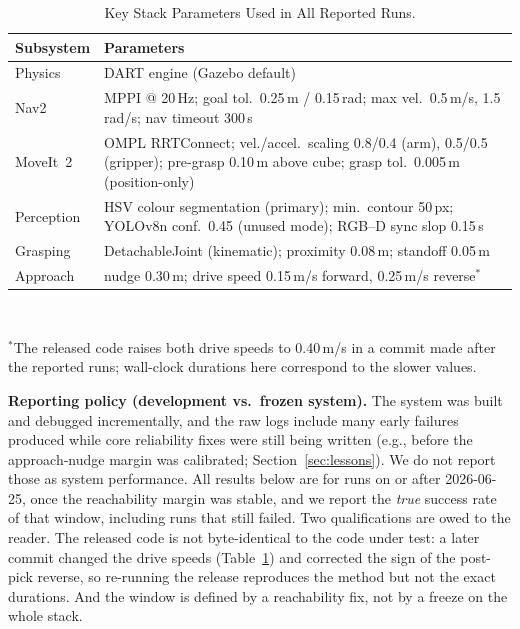 \documentclass[conference]{IEEEtran}
\begin{document}
\begin{table}[t]
\caption{Key Stack Parameters Used in All Reported Runs.}
\label{tab:params}
\centering
\scriptsize
\setlength{\tabcolsep}{3pt}
\begin{tabular}{@{}>{\raggedright\arraybackslash}p{1.35cm}>{\raggedright\arraybackslash}p{6.2cm}@{}}
\toprule
\textbf{Subsystem} & \textbf{Parameters} \\
\midrule
Physics & DART engine (Gazebo default) \\
Nav2 & MPPI @ 20\,Hz; goal tol.\ 0.25\,m / 0.15\,rad; max vel.\ 0.5\,m/s, 1.5\,rad/s; nav timeout 300\,s \\
MoveIt~2 & OMPL RRTConnect; vel./accel.\ scaling 0.8/0.4 (arm), 0.5/0.5 (gripper); pre-grasp 0.10\,m above cube; grasp tol.\ 0.005\,m (position-only) \\
Perception & HSV colour segmentation (primary); min.\ contour 50\,px; YOLOv8n conf.\ 0.45 (unused mode); RGB--D sync slop 0.15\,s \\
Grasping & DetachableJoint (kinematic); proximity 0.08\,m; standoff 0.05\,m \\
Approach & nudge 0.30\,m; drive speed 0.15\,m/s forward, 0.25\,m/s reverse$^{\ast}$ \\
\bottomrule
\end{tabular}
\\[2pt]
\raggedright\scriptsize $^{\ast}$The released code raises both drive speeds
to 0.40\,m/s in a commit made after the reported runs; wall-clock durations
here correspond to the slower values.
\end{table}

\textbf{Reporting policy (development vs.\ frozen system).} The system was
built and debugged incrementally, and the raw logs include many early
failures produced while core reliability fixes were still being written
(e.g., before the approach-nudge margin was calibrated;
Section~\ref{sec:lessons}). We do not report those as system performance.
All results below are for runs on or after 2026-06-25, once the
reachability margin was stable, and we report the \emph{true} success rate
of that window, including runs that still failed. Two qualifications are
owed to the reader. The released code is not byte-identical to the code
under test: a later commit changed the drive speeds
(Table~\ref{tab:params}) and corrected
the sign of the post-pick reverse, so re-running the release reproduces the
method but not the exact durations. And the window is defined by a
reachability fix, not by a freeze on the whole stack.
\end{document}
